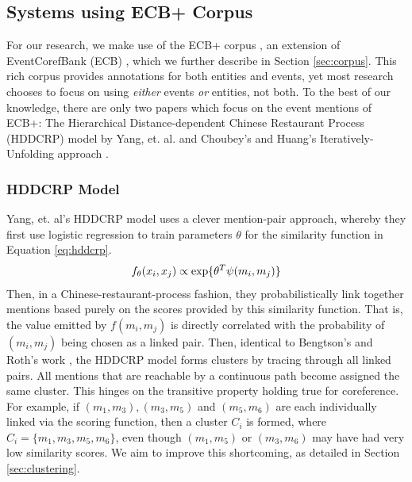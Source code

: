 \documentclass[11pt,a4paper]{article}
\begin{document}
\subsection{Systems using ECB+ Corpus}
For our research, we make use of the ECB+ corpus \cite{ECB+}, an extension of EventCorefBank (ECB) \cite{Bejan:2010:UEC:1858681.1858824}, which we further describe in Section \ref{sec:corpus}.  This rich corpus provides annotations for both entities and events, yet most research chooses to focus on using \textit{either} events \textit{or} entities, not both.  To the best of our knowledge, there are only two papers which focus on the event mentions of ECB+: The Hierarchical Distance-dependent Chinese Restaurant Process (HDDCRP) model by Yang, et. al.  and Choubey's and Huang's Iteratively-Unfolding approach .

\subsubsection{HDDCRP Model}
\label{sec:HDDCRP}
Yang, et. al's HDDCRP model  uses a clever mention-pair approach, whereby they first use logistic regression to train parameters $\theta$ for the similarity function in Equation \ref{eq:hddcrp}.  
\begin{equation}
\label{eq:hddcrp}
f_{\theta}(x_i,x_j) \propto \textnormal{exp\{} \theta^T\psi(m_i,m_j)\textnormal{\}}
\end{equation}
Then, in a Chinese-restaurant-process fashion, they probabilistically link together mentions based purely on the scores provided by this similarity function.  That is, the value emitted by $f(m_i,m_j)$ is directly correlated with the probability of $(m_i,m_j)$ being chosen as a linked pair.  Then, identical to Bengtson's and Roth's work \cite{Bengtson:2008:UVF:1613715.1613756}, the HDDCRP model forms clusters by tracing through all linked pairs. All mentions that are reachable by a continuous path become assigned the same cluster.  This hinges on the transitive property holding true for coreference.  For example, if ${(m_1,m_3),(m_3,m_5)}$ and $(m_5,m_6)$ are each individually linked via the scoring function, then a cluster $C_i$ is formed, where $C_i = \{m_1,m_3,m_5,m_6\}$, even though $(m_1,m_5)$ or $(m_3,m_6)$ may have had very low similarity scores. We aim to improve this shortcoming, as detailed in Section \ref{sec:clustering}.
\end{document}
